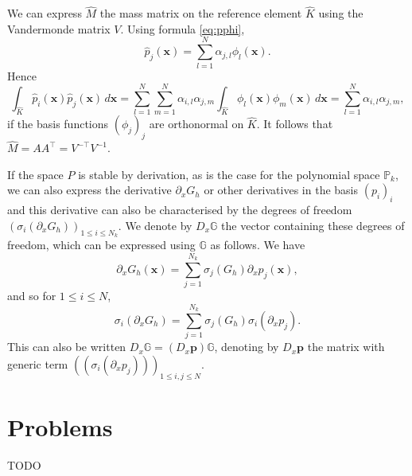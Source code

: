 We can express $\hat{M}$ the mass matrix on the reference element  $\hat{K}$ using the Vandermonde matrix $V$. Using formula \eqref{eq:pphi}, 
$$\hat{p}_j(\mathbf{x})=  \sum_{l=1}^{N} \alpha_{j,l} \phi_l(\mathbf{x}).$$
Hence $$\int_{\hat{K}} \hat{p}_i(\mathbf{x})\hat{p}_j(\mathbf{x})\,d\mathbf{x}
=  \sum_{l=1}^{N} \sum_{m=1}^{N}\alpha_{i,l}\alpha_{j,m} \int_{\hat{K}}\phi_l(\mathbf{x})\phi_m(\mathbf{x})\,d\mathbf{x} = \sum_{l=1}^{N}\alpha_{i,l}\alpha_{j,m},$$
if the basis functions $(\phi_j)_j$ are  orthonormal on $\hat{K}$. It follows that
$\hat{M}=AA^\top = V^{-\top}V^{-1}$.

If the space $P$ is stable by derivation,
as is the case for the polynomial space $\mathbb{P}_k$, we can also express the derivative 
 $\partial_x G_h$ or other derivatives in the  basis  
 $(p_i)_i$ and this derivative can also be characterised by the degrees of freedom 
$(\sigma_i(\partial_x G_h))_{1\leq i \leq N_k}$. We denote by $D_x\mathbb{G}$
the vector containing these degrees of freedom, which can be expressed using $\mathbb{G}$
as follows. We have
$$\partial_x G_h(\mathbf{x}) = \sum_{j=1}^{N_k} \sigma_j(G_h)\partial_x p_j(\mathbf{x}),$$
and so for $1\leq i\leq N$,
$$\sigma_i(\partial_x G_h) = \sum_{j=1}^{N_k} \sigma_j(G_h)\sigma_i(\partial_x p_j).$$
This can also be written $D_x\mathbb{G}= (D_x\mathbf{p})\mathbb{G}$,
denoting by $D_x\mathbf{p}$ the matrix with generic term $((\sigma_i(\partial_x p_j)))_{1\leq i,j \leq N}$.

\section{Problems}

\begin{exercise}
  TODO
\end{exercise}
